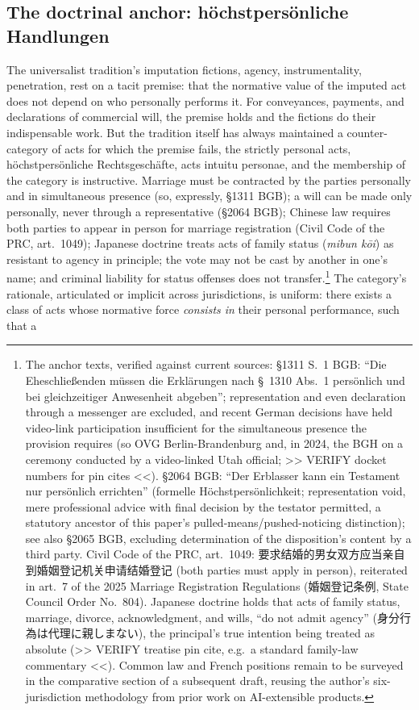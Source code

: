 \documentclass[11pt,a4paper]{article}
\begin{document}
\subsection{The doctrinal anchor: h\"ochstpers\"onliche Handlungen}
\label{p02:sec:synthesis-anchor}

The universalist tradition's imputation fictions, agency, instrumentality, penetration, rest on a tacit premise: that the normative value of the imputed act does not depend on who personally performs it. For conveyances, payments, and declarations of commercial will, the premise holds and the fictions do their indispensable work. But the tradition itself has always maintained a counter-category of acts for which the premise fails, the strictly personal acts, h\"ochstpers\"onliche Rechtsgesch\"afte, acts intuitu personae, and the membership of the category is instructive. Marriage must be contracted by the parties personally and in simultaneous presence (so, expressly, \S 1311 BGB); a will can be made only personally, never through a representative (\S 2064 BGB); Chinese law requires both parties to appear in person for marriage registration (Civil Code of the PRC, art.\ 1049); Japanese doctrine treats acts of family status (\textit{mibun k\=oi}) as resistant to agency in principle; the vote may not be cast by another in one's name; and criminal liability for status offenses does not transfer.\footnote{The anchor texts, verified against current sources: \S 1311 S.~1 BGB: ``Die Eheschlie{\ss}enden m{\"u}ssen die Erkl{\"a}rungen nach \S~1310 Abs.~1 pers{\"o}nlich und bei gleichzeitiger Anwesenheit abgeben''; representation and even declaration through a messenger are excluded, and recent German decisions have held video-link participation insufficient for the simultaneous presence the provision requires (so OVG Berlin-Brandenburg and, in 2024, the BGH on a ceremony conducted by a video-linked Utah official; >> VERIFY docket numbers for pin cites <<). \S 2064 BGB: ``Der Erblasser kann ein Testament nur pers{\"o}nlich errichten'' (formelle H{\"o}chstpers{\"o}nlichkeit; representation void, mere professional advice with final decision by the testator permitted, a statutory ancestor of this paper's pulled-means/pushed-noticing distinction); see also \S 2065 BGB, excluding determination of the disposition's content by a third party. Civil Code of the PRC, art.~1049: {\cjkfont 要求结婚的男女双方应当亲自到婚姻登记机关申请结婚登记} (both parties must apply in person), reiterated in art.~7 of the 2025 Marriage Registration Regulations ({\cjkfont 婚姻登记条例}, State Council Order No.~804). Japanese doctrine holds that acts of family status, marriage, divorce, acknowledgment, and wills, ``do not admit agency'' ({\cjkfont 身分行為は代理に親しまない}), the principal's true intention being treated as absolute (>> VERIFY treatise pin cite, e.g.\ a standard family-law commentary <<). Common law and French positions remain to be surveyed in the comparative section of a subsequent draft, reusing the author's six-jurisdiction methodology from prior work on AI-extensible products.} The category's rationale, articulated or implicit across jurisdictions, is uniform: there exists a class of acts whose normative force \emph{consists in} their personal performance, such that a 
\end{document}
